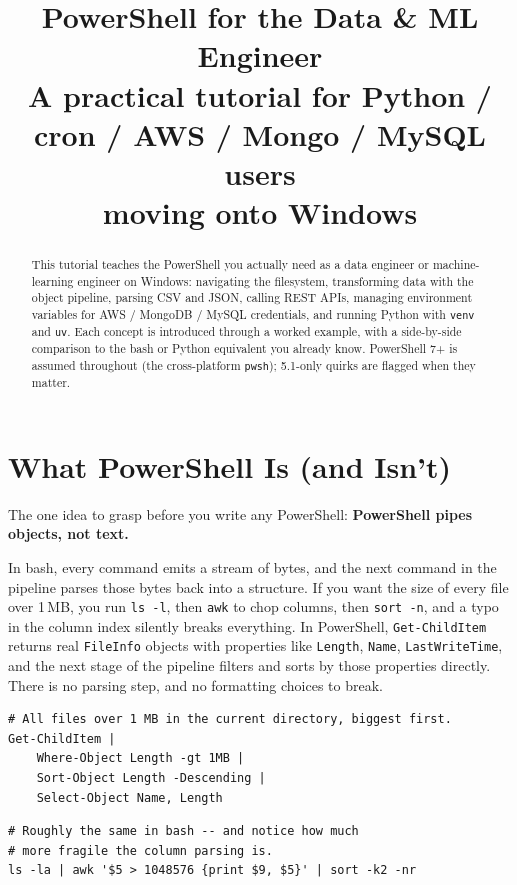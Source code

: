 \documentclass[11pt,a4paper]{article}
\title{\bfseries PowerShell for the Data \& ML Engineer\\
\large A practical tutorial for Python / cron / AWS / Mongo / MySQL users\\moving onto Windows}
\author{}
\date{}
\newcommand{\cmd}[1]{\texttt{\textcolor{pwshKw}{#1}}}
\newcommand{\bcmd}[1]{\texttt{\textcolor{bashKw}{#1}}}
\begin{document}
\maketitle

\begin{abstract}
\noindent
This tutorial teaches the PowerShell you actually need as a data engineer or
machine-learning engineer on Windows: navigating the filesystem, transforming
data with the object pipeline, parsing CSV and JSON, calling REST APIs,
managing environment variables for AWS / MongoDB / MySQL credentials, and
running Python with \texttt{venv} and \texttt{uv}. Each concept is introduced
through a worked example, with a side-by-side comparison to the bash or
Python equivalent you already know. PowerShell 7+ is assumed throughout
(the cross-platform \texttt{pwsh}); 5.1-only quirks are flagged when they
matter.
\end{abstract}

\tableofcontents
\clearpage

\section{What PowerShell Is (and Isn't)}

The one idea to grasp before you write any PowerShell:
\textbf{PowerShell pipes objects, not text.}

In bash, every command emits a stream of bytes, and the next command in the
pipeline parses those bytes back into a structure. If you want the size of
every file over 1\,MB, you run \bcmd{ls -l}, then \bcmd{awk} to chop columns,
then \bcmd{sort -n}, and a typo in the column index silently breaks
everything. In PowerShell, \cmd{Get-ChildItem} returns real
\texttt{FileInfo} objects with properties like \texttt{Length}, \texttt{Name},
\texttt{LastWriteTime}, and the next stage of the pipeline filters and
sorts by those properties directly. There is no parsing step, and no
formatting choices to break.

\begin{lstlisting}[style=pwshstyle]
# All files over 1 MB in the current directory, biggest first.
Get-ChildItem |
    Where-Object Length -gt 1MB |
    Sort-Object Length -Descending |
    Select-Object Name, Length
\end{lstlisting}

\begin{lstlisting}[style=bashstyle]
# Roughly the same in bash -- and notice how much
# more fragile the column parsing is.
ls -la | awk '$5 > 1048576 {print $9, $5}' | sort -k2 -nr
\end{lstlisting}
\end{document}

